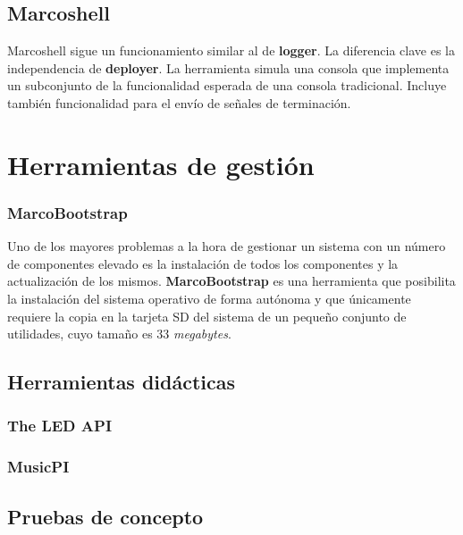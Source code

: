 \subsection{Marcoshell}

Marcoshell sigue un funcionamiento similar al de \textbf{logger}. La diferencia clave es la independencia de \textbf{deployer}. La herramienta simula una consola que implementa un subconjunto de la funcionalidad esperada de una consola tradicional. Incluye también funcionalidad para el envío de señales de terminación.

\section{Herramientas de gestión}

\subsubsection{MarcoBootstrap}

Uno de los mayores problemas a la hora de gestionar un sistema con un número de componentes elevado es la instalación de todos los componentes y la actualización de los mismos. \textbf{MarcoBootstrap} es una herramienta que posibilita la instalación del sistema operativo de forma autónoma y que únicamente requiere la copia en la tarjeta SD del sistema de un pequeño conjunto de utilidades, cuyo tamaño es 33 \textit{megabytes}.





\subsection{Herramientas didácticas}

\subsubsection{The LED API}

\subsubsection{MusicPI}


\subsection{Pruebas de concepto}

